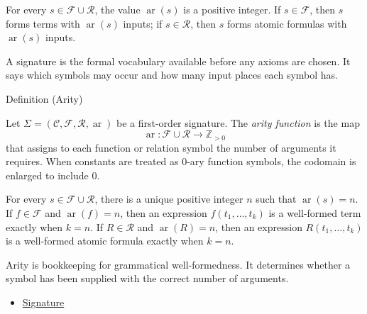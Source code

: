 \begin{remark*}
For every $s\in\mathcal{F}\cup\mathcal{R}$, the value
$\operatorname{ar}(s)$ is a positive integer. If $s\in\mathcal{F}$, then
$s$ forms terms with $\operatorname{ar}(s)$ inputs; if $s\in\mathcal{R}$,
then $s$ forms atomic formulas with $\operatorname{ar}(s)$ inputs.
\end{remark*}

\begin{remark*}[Interpretation]
A signature is the formal vocabulary available before any axioms are chosen.
It says which symbols may occur and how many input places each symbol has.
\end{remark*}

\DefinitionalRoot

\begin{definitionbox}{Definition (Arity)}
\begin{definition}[Arity]
\label{def:arity}
Let $\Sigma=(\mathcal{C},\mathcal{F},\mathcal{R},\operatorname{ar})$ be a
first-order signature. The \emph{arity function} is the map
\[
  \operatorname{ar}:\mathcal{F}\cup\mathcal{R}\to\mathbb{Z}_{>0}
\]
that assigns to each function or relation symbol the number of arguments it
requires. When constants are treated as $0$-ary function symbols, the codomain
is enlarged to include $0$.
\end{definition}
\end{definitionbox}

\begin{remark*}
For every $s\in\mathcal{F}\cup\mathcal{R}$, there is a unique positive
integer $n$ such that $\operatorname{ar}(s)=n$. If $f\in\mathcal{F}$ and
$\operatorname{ar}(f)=n$, then an expression $f(t_1,\ldots,t_k)$ is a
well-formed term exactly when $k=n$. If $R\in\mathcal{R}$ and
$\operatorname{ar}(R)=n$, then an expression $R(t_1,\ldots,t_k)$ is a
well-formed atomic formula exactly when $k=n$.
\end{remark*}

\begin{remark*}[Interpretation]
Arity is bookkeeping for grammatical well-formedness. It determines whether a
symbol has been supplied with the correct number of arguments.
\end{remark*}

\begin{dependencies}
\begin{itemize}
  \item \hyperref[def:signature]{Signature}
\end{itemize}
\end{dependencies}

